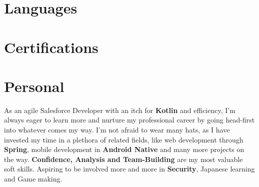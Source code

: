 \documentclass[10pt,a4paper,hidelinks]{moderncv}
\begin{document}
\hfill



\section{Languages}
\closesection{}

\hfill



\section{Certifications}
\closesection{}

\hfill



\section{Personal}
As an agile Salesforce Developer with an itch for \textbf{Kotlin} and efficiency, I'm always eager to learn more and nurture my professional career by going head-first into whatever comes my way. I'm not afraid to wear many hats, as I have invested my time in a plethora of related fields, like web development through \textbf{Spring}, mobile development in \textbf{Android Native} and many more projects on the way. \textbf{Confidence, Analysis and Team-Building} are my most valuable soft skills. Aspiring to be involved more and more in \textbf{Security}, Japanese learning and Game making.
\closesection{}
\end{document}
